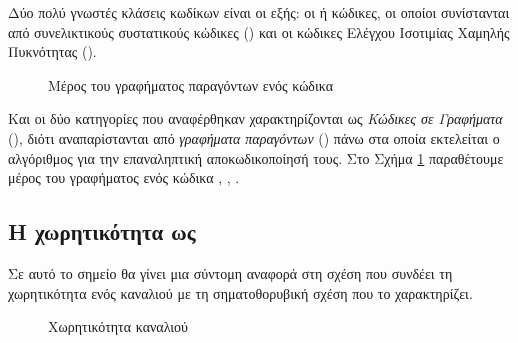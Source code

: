 Δύο πολύ γνωστές κλάσεις  κωδίκων είναι οι εξής: οι  ή  κώδικες, οι οποίοι συνίστανται από συνελικτικούς συστατικούς κώδικες () και οι κώδικες Ελέγχου Ισοτιμίας Χαμηλής Πυκνότητας ().

\begin{figure}[h]
\caption{Μέρος του γραφήματος παραγόντων ενός  κώδικα}
\label{fig:LDPC factor graph}
\end{figure}

Και οι δύο κατηγορίες που αναφέρθηκαν χαρακτηρίζονται ως \textit{Κώδικες σε Γραφήματα} (), διότι αναπαρίστανται από \textit{γραφήματα παραγόντων} () πάνω στα οποία εκτελείται ο αλγόριθμος για την επαναληπτική αποκωδικοποίησή τους. Στο Σχήμα \ref{fig:LDPC factor graph} παραθέτουμε μέρος του γραφήματος ενός  κώδικα \cite{ryan2009channel}, \cite{johnson2009iterative}, \cite{codes2009guest}.

\subsection{Η χωρητικότητα ως }

Σε αυτό το σημείο θα γίνει μια σύντομη αναφορά στη σχέση που συνδέει τη χωρητικότητα ενός καναλιού με τη σηματοθορυβική σχέση  που το χαρακτηρίζει.

\begin{figure}[h]
\caption{Χωρητικότητα  καναλιού}
\label{fig:Channel capacity}
\end{figure}


